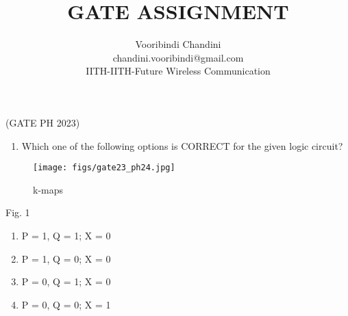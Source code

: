 
\def\mytitle{GATE ASSIGNMENT }
\def\myauthor{Vooribindi Chandini}
\def\mycontact{chandini.vooribindi@gmail.com}
\def\mymodule{IITH-Future Wireless Communication}

\usepackage{graphicx} 
\usepackage{enumitem}
\usepackage{tikz}
\usepackage{circuitikz}
\usepackage{karnaugh-map}
\usepackage{tabularx}
\title{\mytitle}
\author{\myauthor\\\mycontact\\IITH\hspace{0.3em}-\hspace{0.3em}\mymodule}

\maketitle
\hfill(GATE PH 2023)
\begin{enumerate}
    \item  Which one of the following options is CORRECT for the given logic circuit?
\end{enumerate}
\begin{figure}[H]
        \centering
        \texttt{[image: figs/gate23\_ph24.jpg]}
        \caption{k-maps}
        \label{gate23_ph24.jpg}
    \end{figure}  
    
\begin{center}
Fig. 1 
\end{center}

\begin{enumerate}[label=(\alph*)]
    \item P = 1, Q = 1; X = 0
    \item P = 1, Q = 0; X = 0
    \item P = 0, Q = 1; X = 0
    \item P = 0, Q = 0; X = 1
\end{enumerate}
 

